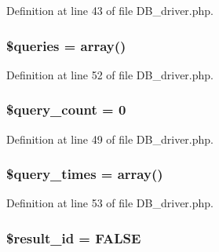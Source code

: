 Definition at line 43 of file D\-B\-\_\-driver.\-php.

\hypertarget{class_c_i___d_b__driver_a576b05de2f452e4cce4e3de12667ba0f}{
\subsubsection[{\$queries}]{\setlength{\rightskip}{0pt plus 5cm}\$queries = array()}}\label{class_c_i___d_b__driver_a576b05de2f452e4cce4e3de12667ba0f}


Definition at line 52 of file D\-B\-\_\-driver.\-php.

\hypertarget{class_c_i___d_b__driver_aa7f7fc5b08bc2c3626ea7065d50c8847}{
\subsubsection[{\$query\-\_\-count}]{\setlength{\rightskip}{0pt plus 5cm}\$query\-\_\-count = 0}}\label{class_c_i___d_b__driver_aa7f7fc5b08bc2c3626ea7065d50c8847}


Definition at line 49 of file D\-B\-\_\-driver.\-php.

\hypertarget{class_c_i___d_b__driver_a060b2893433dfc037803cf6541420f5f}{
\subsubsection[{\$query\-\_\-times}]{\setlength{\rightskip}{0pt plus 5cm}\$query\-\_\-times = array()}}\label{class_c_i___d_b__driver_a060b2893433dfc037803cf6541420f5f}


Definition at line 53 of file D\-B\-\_\-driver.\-php.

\hypertarget{class_c_i___d_b__driver_a0ebacb40e3b6f8bf33d3de0f2cc71474}{
\subsubsection[{\$result\-\_\-id}]{\setlength{\rightskip}{0pt plus 5cm}\$result\-\_\-id = F\-A\-L\-S\-E}}\label{class_c_i___d_b__driver_a0ebacb40e3b6f8bf33d3de0f2cc71474}


